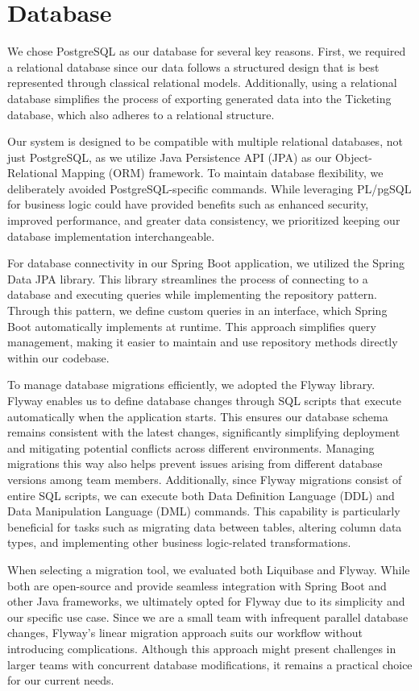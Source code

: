 \section{Database}
We chose PostgreSQL as our database for several key reasons. First, we required a relational database since our data follows a structured design that is best represented through classical relational models. Additionally, using a relational database simplifies the process of exporting generated data into the Ticketing database, which also adheres to a relational structure.

Our system is designed to be compatible with multiple relational databases, not just PostgreSQL, as we utilize Java Persistence API (JPA) as our Object-Relational Mapping (ORM) framework. To maintain database flexibility, we deliberately avoided PostgreSQL-specific commands. While leveraging PL/pgSQL for business logic could have provided benefits such as enhanced security, improved performance, and greater data consistency, we prioritized keeping our database implementation interchangeable.

For database connectivity in our Spring Boot application, we utilized the Spring Data JPA library. This library streamlines the process of connecting to a database and executing queries while implementing the repository pattern. Through this pattern, we define custom queries in an interface, which Spring Boot automatically implements at runtime. This approach simplifies query management, making it easier to maintain and use repository methods directly within our codebase.

To manage database migrations efficiently, we adopted the Flyway library. Flyway enables us to define database changes through SQL scripts that execute automatically when the application starts. This ensures our database schema remains consistent with the latest changes, significantly simplifying deployment and mitigating potential conflicts across different environments. Managing migrations this way also helps prevent issues arising from different database versions among team members. Additionally, since Flyway migrations consist of entire SQL scripts, we can execute both Data Definition Language (DDL) and Data Manipulation Language (DML) commands. This capability is particularly beneficial for tasks such as migrating data between tables, altering column data types, and implementing other business logic-related transformations.

When selecting a migration tool, we evaluated both Liquibase and Flyway. While both are open-source and provide seamless integration with Spring Boot and other Java frameworks, we ultimately opted for Flyway due to its simplicity and our specific use case. Since we are a small team with infrequent parallel database changes, Flyway’s linear migration approach suits our workflow without introducing complications. Although this approach might present challenges in larger teams with concurrent database modifications, it remains a practical choice for our current needs.

